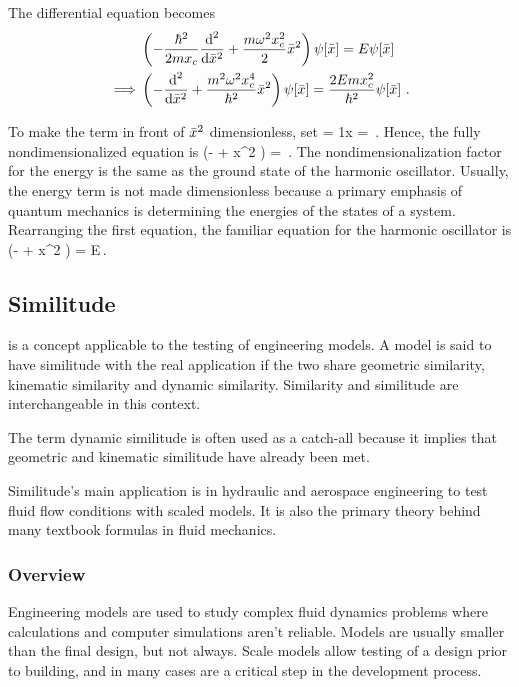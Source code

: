 The differential equation becomes
\begin{align*}
&\left(
  - \dfrac{\hbar^2}{2m\chpq x}\nxod 2{}{\scpq x} 
  + \dfrac{m\omega^2\chpq x^2}{2}\scpq x^2
\right) 
  \psi\vat{\scpq x}
  =
  E\psi\vat{\scpq x}\\
%
\implies &
%
\left(
  - \nxod 2{}{\scpq x} 
  + \dfrac{m^2\omega^2\chpq x^4}{\hbar^2}\scpq x^2
\right) 
  \psi\vat{\scpq x}
  =
  \dfrac{2Em\chpq x^2}{\hbar^2}\psi\vat{\scpq x}\,.
\end{align*}

To make the term in front of $\bar{x}^2$ dimensionless, set
\beq
{} = 1\implies \chpq x = \,.
\eeq
Hence, the fully nondimensionalized equation is
\beq
\left(- + \scpq x^2 \right)\psi{} 
    = \psi{}
     {}\psi{} \,. 
\eeq
The nondimensionalization factor for the energy is the same as the ground state of the harmonic oscillator. Usually, the energy term is not made dimensionless because a primary emphasis of quantum mechanics is determining the energies of the states of a system. Rearranging the first equation, the familiar equation for the harmonic oscillator is
\beq
{}\left(- + \scpq x^2 \right)\psi{}
    = E\psi{}\,.
\eeq


\subsection{Similitude}
 is a concept applicable to the testing of engineering models. A model is said to have similitude with the real application if the two share geometric similarity, kinematic similarity and dynamic similarity. Similarity and similitude are interchangeable in this context.

The term dynamic similitude is often used as a catch-all because it implies that geometric and kinematic similitude have already been met.

Similitude's main application is in hydraulic and aerospace engineering to test fluid flow conditions with scaled models. It is also the primary theory behind many textbook formulas in fluid mechanics.


\subsubsection{Overview}
Engineering models are used to study complex fluid dynamics problems where calculations and computer simulations aren't reliable. Models are usually smaller than the final design, but not always. Scale models allow testing of a design prior to building, and in many cases are a critical step in the development process.

